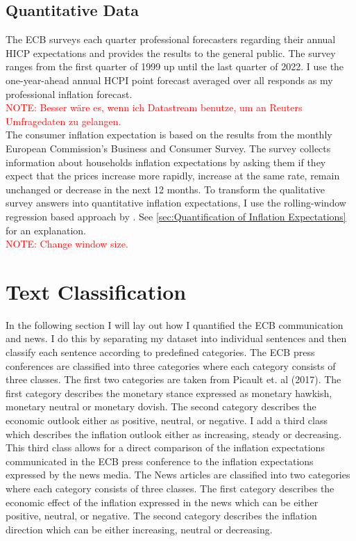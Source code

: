 \documentclass[review]{elsarticle}
\begin{document}
\subsection{Quantitative Data} \label{sec:Quantitative Data}

The ECB surveys each quarter professional forecasters regarding their annual HICP expectations and provides the results to the general public. The survey ranges from the first quarter of 1999 up until the last quarter of 2022. I use the one-year-ahead annual HCPI point forecast averaged over all responds as my professional inflation forecast. 
\\
\textcolor{red}{NOTE: Besser wäre es, wenn ich Datastream benutze, um an Reuters Umfragedaten zu gelangen.}
\\
The consumer inflation expectation is based on the results from the monthly European Commission’s Business and Consumer Survey. The survey collects information about households inflation expectations by asking them if they expect that the prices increase more rapidly, increase at the same rate, remain unchanged or decrease in the next 12 months. To transform the qualitative survey answers into quantitative inflation expectations, I use the rolling-window regression based approach by \cite{Lahiri2015}. See \ref{sec:Quantification of Inflation Expectations} for an explanation.
\\
\textcolor{red}{NOTE: Change window size.}

\section{Text Classification} \label{sec:Text Classification}

In the following section I will lay out how I quantified the ECB communication and news. I do this by separating my dataset into individual sentences and then classify each sentence according to predefined categories. The ECB press conferences are classified into three categories where each category consists of three classes. The first two categories are taken from Picault et. al (2017). The first category describes the monetary stance expressed as monetary hawkish, monetary neutral or monetary dovish. The second category describes the economic outlook either as positive, neutral, or negative. I add a third class which describes the inflation outlook either as increasing, steady or decreasing. This third class allows for a direct comparison of the inflation expectations communicated in the ECB press conference to the inflation expectations expressed by the news media.
The News articles are classified into two categories where each category consists of three classes. The first category describes the economic effect of the inflation expressed in the news which can be either positive, neutral, or negative. The second category describes the inflation direction which can be either increasing, neutral or decreasing.
\end{document}
